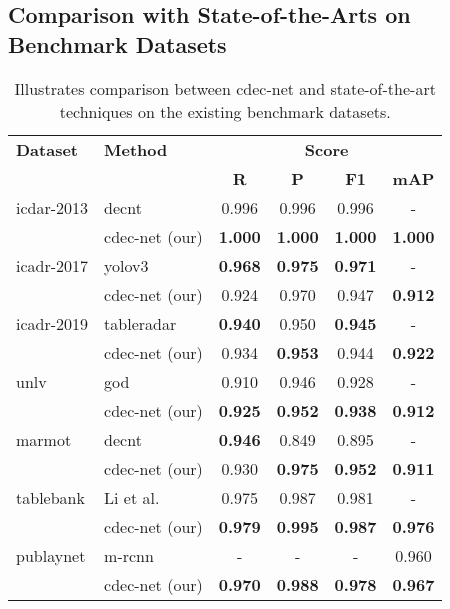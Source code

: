 \documentclass[a4paper,conference]{IEEEtran}
\begin{document}
\subsection{Comparison with State-of-the-Arts on Benchmark Datasets}

\begin{table}[ht!]
\begin{center}
\begin{tabular}{|l|l|c c c c|} \hline
\textbf{Dataset} &\textbf{Method} &\multicolumn{4}{|c|}{\textbf{Score}} \\ \cline{3-6}
 &  &\textbf{R} &\textbf{P} &\textbf{F1} &\textbf{mAP} \\ \hline 
{\sc icdar-2013} &{\sc d}e{\sc cnt}~\cite{siddiqui2018decnt} &0.996 &0.996 &0.996 &- \\
 &{\sc cd}e{\sc c-n}et (our) &\textbf{1.000} &\textbf{1.000} &\textbf{1.000} &\textbf{1.000} \\ \hline
{\sc icadr-2017} &{\sc yolo}v3~\cite{huang2019yolo} &\textbf{0.968} &\textbf{0.975} &\textbf{0.971} &- \\
&{\sc cd}e{\sc c-n}et (our) &0.924 &0.970 &0.947 &\textbf{0.912} \\  \hline
{\sc icadr-2019} &{\sc t}able{\sc r}adar~\cite{gao2019icdar} &\textbf{0.940} &0.950 &\textbf{0.945} &- \\
 &{\sc cd}e{\sc c-n}et (our) &0.934 &\textbf{0.953} &0.944 &\textbf{0.922} \\ \hline 
{\sc unlv} &{\sc god}~\cite{saha2019graphical} &0.910 &0.946 &0.928 &- \\ 
 &{\sc cd}e{\sc c-n}et (our) &\textbf{0.925} &\textbf{0.952} &\textbf{0.938} & \textbf{0.912} \\ \hline
{\sc m}armot &{\sc d}e{\sc cnt}~\cite{siddiqui2018decnt} &\textbf{0.946} &0.849 &0.895 &- \\ 
&{\sc cd}e{\sc c-n}et (our) &0.930 &\textbf{0.975} &\textbf{0.952} &\textbf{0.911} \\ \hline
{\sc t}able{\sc b}ank &Li et al.~\cite{li2019tablebank} &0.975 &0.987 &0.981 &- \\
 &{\sc cd}e{\sc c-n}et (our) & \textbf{0.979} & \textbf{0.995} & \textbf{0.987} & \textbf{0.976}\\ \hline
{\sc p}ub{\sc l}ay{\sc n}et &{\sc m-rcnn}~\cite{zhong2019publaynet} &- & -&- &0.960 \\ 
 &{\sc cd}e{\sc c-n}et (our) & \textbf{0.970} & \textbf{0.988} & \textbf{0.978} & \textbf{0.967}  \\ \hline
 \end{tabular}
\end{center}
\caption{Illustrates comparison between {\sc cd}e{\sc c-n}et and state-of-the-art techniques on the existing benchmark datasets. \label{comparion_table}}
\end{table}
\end{document}

